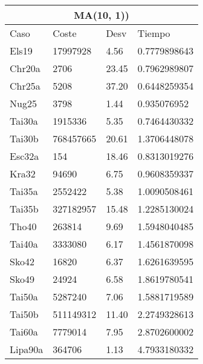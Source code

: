 \documentclass[twoside]{article}
\begin{document}
\begin{table}[h]
\centering
    \begin{tabular}{llll}
    \hline
    \multicolumn{4}{c}{MA(10, 1))} \\
    \toprule
    Caso               & Coste & Desv & Tiempo \\
    \midrule
Els19&17997928&4.56&0.7779898643\\
Chr20a&2706&23.45&0.7962989807\\
Chr25a&5208&37.20&0.6448259354\\
Nug25&3798&1.44&0.935076952\\
Tai30a&1915336&5.35&0.7464430332\\
Tai30b&768457665&20.61&1.3706448078\\
Esc32a&154&18.46&0.8313019276\\
Kra32&94690&6.75&0.9608359337\\
Tai35a&2552422&5.38&1.0090508461\\
Tai35b&327182957&15.48&1.2285130024\\
Tho40&263814&9.69&1.5948040485\\
Tai40a&3333080&6.17&1.4561870098\\
Sko42&16820&6.37&1.6261639595\\
Sko49&24924&6.58&1.8619780541\\
Tai50a&5287240&7.06&1.5881719589\\
Tai50b&511149312&11.40&2.2749328613\\
Tai60a&7779014&7.95&2.8702600002\\
Lipa90a&364706&1.13&4.7933180332\\
    \bottomrule
    \end{tabular}
    \caption{}
\end{table}
\end{document}
